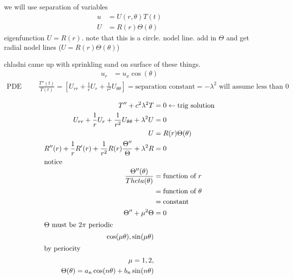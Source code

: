 \documentclass{article}
\begin{document}
we will use separation of variables
\begin{align*}
  u&=U(r,\theta)T(t)\\
  U&=R(r)\Theta(\theta)
\end{align*}
eigenfunction $U=R(r)$. note that this is a circle. nodel line. add in $\Theta$ and get radial nodel lines ($U=R(r)\Theta(\theta)$)

chladni came up with sprinkling sand on surface of these things.
\begin{align*}
  u_r&=u_x\cos(\theta)
\end{align*}
\begin{align*}
  \text{PDE}&&&\frac{T''(t)}{T(t)}=\left[U_{rr}+\frac{1}{r}U_{r}+\frac{1}{r^2}U_{\theta\theta}\right]=\text{separation constant}=-\lambda^2\text{ will assume less than 0}\\
\end{align*}
\begin{align*}
  T''+c^2\lambda^2T&=0\leftarrow \text{trig solution}\\
  U_{rr}+\frac{1}{r}U_r+\frac{1}{r^2}U_{\theta\theta}+\lambda^2U&=0\\
  U&=R(r)\Theta(\theta)\\
  R''(r)+\frac{1}{r}R'(r)+\frac{1}{r^2}R(r)\frac{\Theta''}{\Theta}+\lambda^2R&=0\\
  \intertext{notice}
  \frac{\Theta''(\theta)}{Theta(\theta)}&=\text{function of }r\\
  &=\text{function of }\theta\\
  &=\text{constant}\\
  \Theta''+\mu^2\Theta&=0\\
  \intertext{$\Theta$ must be $2\pi$ periodic}
  \cos(\mu\theta),\sin(\mu\theta)\\
  \intertext{by periocity}
  \mu=1,2,\\
  \Theta(\theta)=a_n\cos(n\theta)+b_n\sin(n\theta)
\end{align*}
\end{document}
